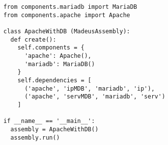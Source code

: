 \begin{lstlisting}[label=codeass,caption=Madeus code of the assembly
  of Figure~\ref{fig:example}.]
from components.mariadb import MariaDB
from components.apache import Apache

class ApacheWithDB (MadeusAssembly):
  def create():
    self.components = {
      'apache': Apache(),
      'mariadb': MariaDB()
    }
    self.dependencies = [
      ('apache', 'ipMDB', 'mariadb', 'ip'),
      ('apache', 'servMDB', 'mariadb', 'serv')
    ]

if __name__ == '__main__':
  assembly = ApacheWithDB()
  assembly.run()
\end{lstlisting}
